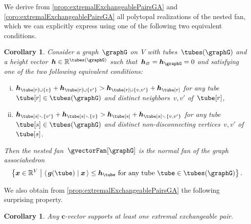 \documentclass{amsart}
\newtheorem{corollary}[theorem]{Corollary}
\theoremstyle{definition}
\newcommand{\R}{\mathbb{R}} %
\renewcommand{\b}[1]{{\boldsymbol{#1}}} %
\newcommand{\set}[2]{\left\{ #1 \;\middle|\; #2 \right\}} %
\newcommand{\ssm}{\smallsetminus} %
\newcommand{\dotprod}[2]{\left\langle \, #1 \; \middle| \; #2 \, \right\rangle} %
\newcommand{\gvector}[1]{\b{g}(#1)} %
\newcommand{\ground}{V} %
\newcommand{\connectedComponents}{\kappa} %
\begin{document}
We derive from \cref{prop:extremalExchangeablePairsGA} and \cref{coro:extremalExchangeablePairsGA} all polytopal realizations of the nested fan, which we can explicitly express using one of the following two equivalent conditions.


\begin{corollary}
Consider a graph~$\graphG$ on~$\ground$ with tubes~$\tubes(\graphG)$ and a height vector~$\b{h} \in \R^{\tubes(\graphG)}$ such that~$\b{h}_{\varnothing} = \b{h}_{\graphG} = 0$ and satisfying one of the two following equivalent conditions:
\begin{enumerate}[(i)]
\item $\b{h}_{\tube[r] \cup \{v\}} + \b{h}_{\tube[r] \cup \{v'\}} > \b{h}_{\tube[r] \cup \{v, v'\}} + \b{h}_{\tube[r]}$ for any tube~$\tube[r] \in \tubes(\graphG)$ and distinct neighbors~$v,v'$ of~$\tube[r]$,
\item $\b{h}_{\tube[s] \ssm \{v'\}} + \b{h}_{\tube[s] \ssm \{v\}} > \b{h}_{\tube[s]} + \b{h}_{\tube[s] \ssm \{v, v'\}}$ for any tube~$\tube[s] \in \tubes(\graphG)$ and distinct non-disconnecting vertices~$v,v'$ of~$\tube[s]$.
\end{enumerate}
Then the nested fan~$\gvectorFan[\graphG]$ is the normal fan of the graph associahedron
\[
\set{\b{x} \in \R^\ground}{\dotprod{\gvector{\tube}}{\b{x}} \le \b{h}_{\tube} \text{ for any tube } \tube \in \tubes(\graphG)}.
\]
\end{corollary}

We also obtain from \cref{prop:extremalExchangeablePairsGA} the following surprising property.

\begin{corollary}
Any $\b{c}$-vector supports at least one extremal exchangeable pair.
\end{corollary}
\end{document}
